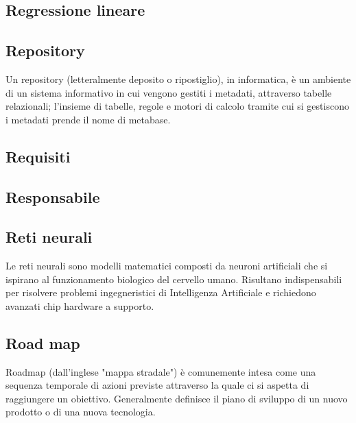 
\subsection*{Regressione lineare}

\subsection*{Repository}
Un repository (letteralmente deposito o ripostiglio), in informatica, è un ambiente di un sistema informativo  in cui vengono gestiti i metadati, attraverso tabelle relazionali; l'insieme di tabelle, regole e motori di calcolo tramite cui si gestiscono i metadati prende il nome di metabase.

\subsection*{Requisiti}

\subsection*{Responsabile}

\subsection*{Reti neurali}
Le reti neurali sono modelli matematici composti da neuroni artificiali che si ispirano al funzionamento biologico del cervello umano. 
Risultano indispensabili per risolvere problemi ingegneristici di Intelligenza Artificiale e richiedono avanzati chip hardware a supporto.

\subsection*{Road map}
Roadmap (dall'inglese "mappa stradale") è comunemente intesa come una sequenza temporale di azioni previste attraverso la quale ci si aspetta di raggiungere un obiettivo. Generalmente definisce il piano di sviluppo di un nuovo prodotto o di una nuova tecnologia.

